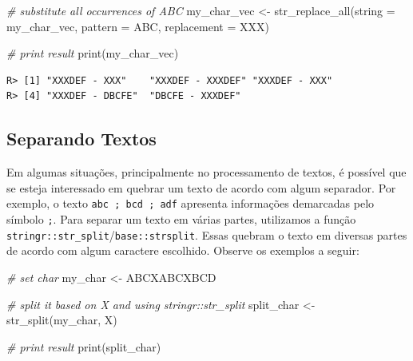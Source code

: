 \documentclass[
  11pt,
]{book}
\newenvironment{Shaded}{\begin{snugshade}}{\end{snugshade}}
\newcommand{\AttributeTok}[1]{\textcolor[rgb]{0.61,0.61,0.61}{#1}}
\newcommand{\CommentTok}[1]{\textcolor[rgb]{0.37,0.37,0.37}{\textit{#1}}}
\newcommand{\FunctionTok}[1]{\textcolor[rgb]{0,0,0}{#1}}
\newcommand{\NormalTok}[1]{#1}
\newcommand{\OtherTok}[1]{\textcolor[rgb]{0.37,0.37,0.37}{#1}}
\newcommand{\StringTok}[1]{\textcolor[rgb]{0.5,0.5,0.5}{#1}}
\begin{document}
\begin{Shaded}
\begin{Highlighting}[]
\CommentTok{\# substitute all occurrences of \textquotesingle{}ABC\textquotesingle{}}
\NormalTok{my\_char\_vec }\OtherTok{\textless{}{-}} \FunctionTok{str\_replace\_all}\NormalTok{(}\AttributeTok{string =}\NormalTok{ my\_char\_vec,}
                               \AttributeTok{pattern =} \StringTok{\textquotesingle{}ABC\textquotesingle{}}\NormalTok{,}
                               \AttributeTok{replacement =} \StringTok{\textquotesingle{}XXX\textquotesingle{}}\NormalTok{)}

\CommentTok{\# print result}
\FunctionTok{print}\NormalTok{(my\_char\_vec)}
\end{Highlighting}
\end{Shaded}

\begin{verbatim}
R> [1] "XXXDEF - XXX"    "XXXDEF - XXXDEF" "XXXDEF - XXX"   
R> [4] "XXXDEF - DBCFE"  "DBCFE - XXXDEF"
\end{verbatim}

\hypertarget{separando-textos}{%
\subsection{Separando Textos}\label{separando-textos}}

Em algumas situações, principalmente no processamento de textos, é possível que se esteja interessado em quebrar um texto de acordo com algum separador. Por exemplo, o texto \texttt{abc\ ;\ bcd\ ;\ adf} apresenta informações demarcadas pelo símbolo \texttt{;}. Para separar um texto em várias partes, utilizamos a função \texttt{stringr::str\_split}/\texttt{base::strsplit}. Essas quebram o texto em diversas partes de acordo com algum caractere escolhido. Observe os exemplos a seguir: 

\begin{Shaded}
\begin{Highlighting}[]
\CommentTok{\# set char}
\NormalTok{my\_char }\OtherTok{\textless{}{-}} \StringTok{\textquotesingle{}ABCXABCXBCD\textquotesingle{}}

\CommentTok{\# split it based on \textquotesingle{}X\textquotesingle{} and using stringr::str\_split}
\NormalTok{split\_char }\OtherTok{\textless{}{-}} \FunctionTok{str\_split}\NormalTok{(my\_char, }\StringTok{\textquotesingle{}X\textquotesingle{}}\NormalTok{)}

\CommentTok{\# print result}
\FunctionTok{print}\NormalTok{(split\_char)}
\end{Highlighting}
\end{Shaded}
\end{document}

